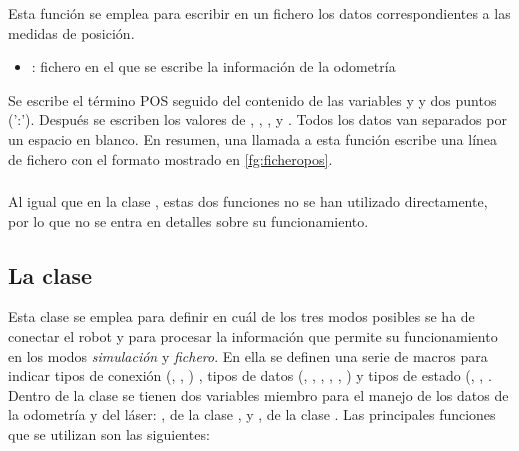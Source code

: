 
\noindent
Esta función se emplea para escribir en un fichero los datos correspondientes a las medidas de posición.

\begin{itemize}
  \item {}: fichero en el que se escribe la información de la odometría
\end{itemize}

\noindent
Se escribe el término POS seguido del contenido de las variables  y  y dos puntos (':'). Después se escriben los valores de , , ,  y . Todos los datos van separados por un espacio en blanco. En resumen, una llamada a esta función escribe una línea de fichero con el formato mostrado en \ref{fg:ficheropos}.

\subsubsection {}
\subsubsection {}

\vspace{0.2cm}
\noindent
Al igual que en la clase , estas dos funciones no se han utilizado directamente, por lo que no se entra en detalles sobre su funcionamiento.

\subsection{La clase }
Esta clase se emplea para definir en cuál de los tres modos posibles se ha de conectar el robot y para procesar la información que permite su funcionamiento en los modos \emph{simulación} y \emph{fichero}. En ella se definen una serie de macros para indicar tipos de conexión (, , ) , tipos de datos (, , , , , ) y tipos de estado (,  , . Dentro de la clase se tienen dos variables miembro para el manejo de los datos de la odometría y del láser: , de la clase , y , de la clase . Las principales funciones que se utilizan son las siguientes:

